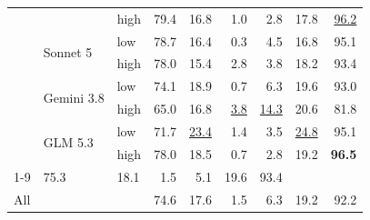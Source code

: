 \begin{tabular}{lll rrrr rr}
 &  & high & 79.4 & 16.8 & 1.0 & 2.8 & 17.8 & \underline{96.2} \\
 & \multirow{2}{*}{Sonnet 5} & low & 78.7 & 16.4 & 0.3 & 4.5 & 16.8 & 95.1 \\
 &  & high & 78.0 & 15.4 & 2.8 & 3.8 & 18.2 & 93.4 \\
 & \multirow{2}{*}{Gemini 3.8} & low & 74.1 & 18.9 & 0.7 & 6.3 & 19.6 & 93.0 \\
 &  & high & 65.0 & 16.8 & \underline{3.8} & \underline{14.3} & 20.6 & 81.8 \\
 & \multirow{2}{*}{GLM 5.3} & low & 71.7 & \underline{23.4} & 1.4 & 3.5 & \underline{24.8} & 95.1 \\
 &  & high & 78.0 & 18.5 & 0.7 & 2.8 & 19.2 & \textbf{96.5} \\
\cmidrule(lr){1-9}
\multicolumn{3}{l}{Claude SDK average} & 75.3 & 18.1 & 1.5 & 5.1 & 19.6 & 93.4 \\
\midrule
\multicolumn{3}{l}{All} & 74.6 & 17.6 & 1.5 & 6.3 & 19.2 & 92.2 \\
\bottomrule
\end{tabular}